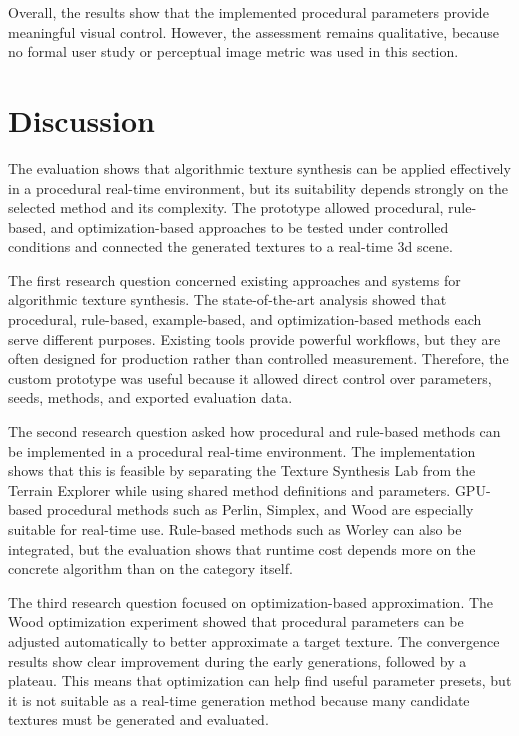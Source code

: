 Overall, the results show that the implemented procedural parameters provide meaningful visual control. However, the assessment remains qualitative, because no formal user study or perceptual image metric was used in this section.

\section{Discussion}

The evaluation shows that algorithmic texture synthesis can be applied effectively in a procedural real-time environment, but its suitability depends strongly on the selected method and its complexity. The prototype allowed procedural, rule-based, and optimization-based approaches to be tested under controlled conditions and connected the generated textures to a real-time \gls{3d} scene.

The first research question concerned existing approaches and systems for algorithmic texture synthesis. The state-of-the-art analysis showed that procedural, rule-based, example-based, and optimization-based methods each serve different purposes. Existing tools provide powerful workflows, but they are often designed for production rather than controlled measurement. Therefore, the custom prototype was useful because it allowed direct control over parameters, seeds, methods, and exported evaluation data.

The second research question asked how procedural and rule-based methods can be implemented in a procedural real-time environment. The implementation shows that this is feasible by separating the Texture Synthesis Lab from the Terrain Explorer while using shared method definitions and parameters. GPU-based procedural methods such as Perlin, Simplex, and Wood are especially suitable for real-time use. Rule-based methods such as Worley can also be integrated, but the evaluation shows that runtime cost depends more on the concrete algorithm than on the category itself.

The third research question focused on optimization-based approximation. The Wood optimization experiment showed that procedural parameters can be adjusted automatically to better approximate a target texture. The convergence results show clear improvement during the early generations, followed by a plateau. This means that optimization can help find useful parameter presets, but it is not suitable as a real-time generation method because many candidate textures must be generated and evaluated.

